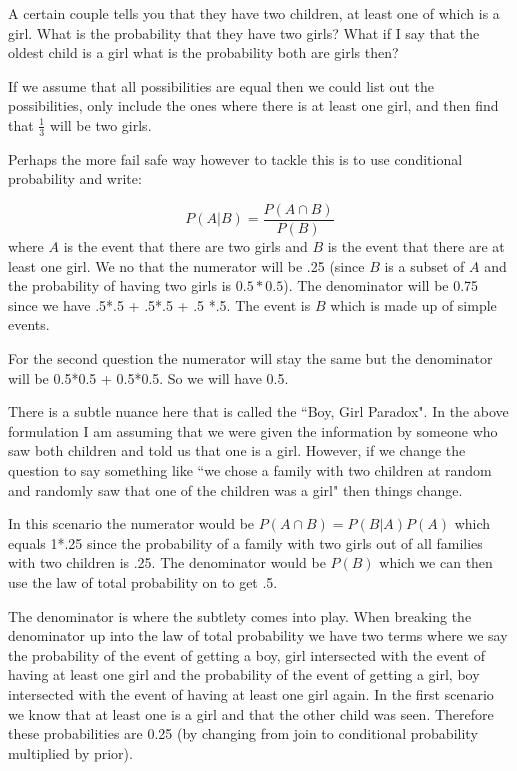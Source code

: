 \begin{enumerate}
A certain couple tells you that they have two children, at least one of which is a girl. What is the probability that they have two girls? What if I say that the oldest child is a girl what is the probability both are girls then?

If we assume that all possibilities are equal then we could list out the possibilities, only include the ones where there is at least one girl, and then find that $\frac{1}{3}$ will be two girls.

Perhaps the more fail safe way however to tackle this is to use conditional probability and write:

\begin{equation}
P(A|B) = \frac{P(A \cap B)}{P(B)}
\end{equation}
\noindent where $A$ is the event that there are two girls and $B$ is the event that there are at least one girl. We no that the numerator will be .25 (since $B$ is a subset of $A$ and the probability of having two girls is $0.5 * 0.5$). The denominator will be 0.75 since we have .5*.5 + .5*.5 + .5 *.5. The event is $B$ which is made up of simple events.

For the second question the numerator will stay the same but the denominator will be 0.5*0.5 + 0.5*0.5. So we will have 0.5. 

There is a subtle nuance here that is called the ``Boy, Girl Paradox". In the above formulation I am assuming that we were given the information by someone who saw both children and told us that one is a girl. However, if we change the question to say something like ``we chose a family with two children at random and randomly saw that one of the children was a girl" then things change. 

In this scenario the numerator would be $P(A  \cap B) = P(B|A)P(A)$ which equals 1*.25 since the probability of a family with two girls out of all families with two children is .25. The denominator would be $P(B)$ which we can then use the law of total probability on to get .5. 

The denominator is where the subtlety comes into play. When breaking the denominator up into the law of total probability we have two terms where we say the probability of the event of getting a boy, girl intersected with the event of having at least one girl and the probability of the event of getting a girl, boy intersected  with the event of having at least one girl again. In the first scenario we know that at least one is a girl and that the other child was seen. Therefore these probabilities are 0.25 (by changing from join to conditional probability multiplied by prior).


\end{enumerate}

